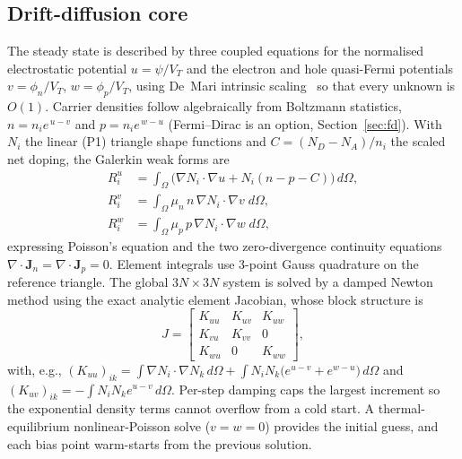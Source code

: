 \documentclass[conference]{IEEEtran}
\begin{document}
\subsection{Drift-diffusion core}
\label{sec:ddcore}
The steady state is described by three coupled equations for the normalised
electrostatic potential $u=\psi/V_T$ and the electron and hole quasi-Fermi
potentials $v=\phi_n/V_T$, $w=\phi_p/V_T$, using De~Mari intrinsic
scaling~\cite{demari} so that every unknown is $O(1)$. Carrier densities follow
algebraically from Boltzmann statistics, $n=n_i e^{\,u-v}$ and $p=n_i e^{\,w-u}$
(Fermi--Dirac is an option, Section~\ref{sec:fd}). With $N_i$ the linear (P1)
triangle shape functions and $C=(N_D-N_A)/n_i$ the scaled net doping, the Galerkin
weak forms are
\begin{align}
R_i^{u} &= \int_\Omega\!\big(\nabla N_i\!\cdot\!\nabla u + N_i(n-p-C)\big)\,d\Omega,\\
R_i^{v} &= \int_\Omega \mu_n\,n\,\nabla N_i\!\cdot\!\nabla v\;d\Omega,\\
R_i^{w} &= \int_\Omega \mu_p\,p\,\nabla N_i\!\cdot\!\nabla w\;d\Omega,
\end{align}
expressing Poisson's equation and the two zero-divergence continuity equations
$\nabla\!\cdot\!\mathbf{J}_n=\nabla\!\cdot\!\mathbf{J}_p=0$. Element integrals use
3-point Gauss quadrature on the reference triangle. The global $3N\times3N$ system
is solved by a damped Newton method using the exact analytic element Jacobian,
whose block structure is
\begin{equation}
J=\begin{bmatrix} K_{uu} & K_{uv} & K_{uw}\\ K_{vu} & K_{vv} & 0\\ K_{wu} & 0 & K_{ww}\end{bmatrix},
\end{equation}
with, e.g., $(K_{uu})_{ik}=\int\nabla N_i\!\cdot\!\nabla N_k\,d\Omega
+\int N_iN_k\big(e^{u-v}+e^{w-u}\big)\,d\Omega$ and
$(K_{uv})_{ik}=-\int N_iN_k e^{u-v}\,d\Omega$. Per-step damping caps the largest
increment so the exponential density terms cannot overflow from a cold start. A
thermal-equilibrium nonlinear-Poisson solve ($v=w=0$) provides the initial guess,
and each bias point warm-starts from the previous solution.
\end{document}
